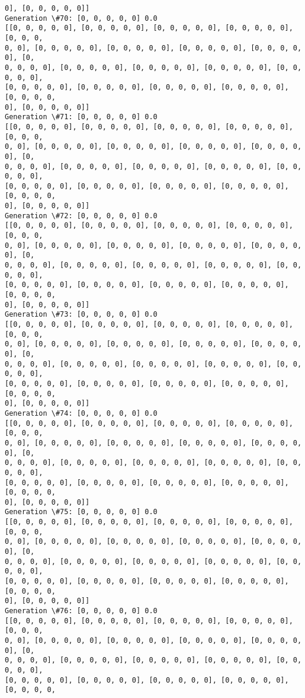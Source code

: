 \documentclass[11pt]{article}
\begin{document}
\begin{Verbatim}[commandchars=\\\{\}]
0], [0, 0, 0, 0, 0]]
Generation \#70: [0, 0, 0, 0, 0] 0.0
[[0, 0, 0, 0, 0], [0, 0, 0, 0, 0], [0, 0, 0, 0, 0], [0, 0, 0, 0, 0], [0, 0, 0,
0, 0], [0, 0, 0, 0, 0], [0, 0, 0, 0, 0], [0, 0, 0, 0, 0], [0, 0, 0, 0, 0], [0,
0, 0, 0, 0], [0, 0, 0, 0, 0], [0, 0, 0, 0, 0], [0, 0, 0, 0, 0], [0, 0, 0, 0, 0],
[0, 0, 0, 0, 0], [0, 0, 0, 0, 0], [0, 0, 0, 0, 0], [0, 0, 0, 0, 0], [0, 0, 0, 0,
0], [0, 0, 0, 0, 0]]
Generation \#71: [0, 0, 0, 0, 0] 0.0
[[0, 0, 0, 0, 0], [0, 0, 0, 0, 0], [0, 0, 0, 0, 0], [0, 0, 0, 0, 0], [0, 0, 0,
0, 0], [0, 0, 0, 0, 0], [0, 0, 0, 0, 0], [0, 0, 0, 0, 0], [0, 0, 0, 0, 0], [0,
0, 0, 0, 0], [0, 0, 0, 0, 0], [0, 0, 0, 0, 0], [0, 0, 0, 0, 0], [0, 0, 0, 0, 0],
[0, 0, 0, 0, 0], [0, 0, 0, 0, 0], [0, 0, 0, 0, 0], [0, 0, 0, 0, 0], [0, 0, 0, 0,
0], [0, 0, 0, 0, 0]]
Generation \#72: [0, 0, 0, 0, 0] 0.0
[[0, 0, 0, 0, 0], [0, 0, 0, 0, 0], [0, 0, 0, 0, 0], [0, 0, 0, 0, 0], [0, 0, 0,
0, 0], [0, 0, 0, 0, 0], [0, 0, 0, 0, 0], [0, 0, 0, 0, 0], [0, 0, 0, 0, 0], [0,
0, 0, 0, 0], [0, 0, 0, 0, 0], [0, 0, 0, 0, 0], [0, 0, 0, 0, 0], [0, 0, 0, 0, 0],
[0, 0, 0, 0, 0], [0, 0, 0, 0, 0], [0, 0, 0, 0, 0], [0, 0, 0, 0, 0], [0, 0, 0, 0,
0], [0, 0, 0, 0, 0]]
Generation \#73: [0, 0, 0, 0, 0] 0.0
[[0, 0, 0, 0, 0], [0, 0, 0, 0, 0], [0, 0, 0, 0, 0], [0, 0, 0, 0, 0], [0, 0, 0,
0, 0], [0, 0, 0, 0, 0], [0, 0, 0, 0, 0], [0, 0, 0, 0, 0], [0, 0, 0, 0, 0], [0,
0, 0, 0, 0], [0, 0, 0, 0, 0], [0, 0, 0, 0, 0], [0, 0, 0, 0, 0], [0, 0, 0, 0, 0],
[0, 0, 0, 0, 0], [0, 0, 0, 0, 0], [0, 0, 0, 0, 0], [0, 0, 0, 0, 0], [0, 0, 0, 0,
0], [0, 0, 0, 0, 0]]
Generation \#74: [0, 0, 0, 0, 0] 0.0
[[0, 0, 0, 0, 0], [0, 0, 0, 0, 0], [0, 0, 0, 0, 0], [0, 0, 0, 0, 0], [0, 0, 0,
0, 0], [0, 0, 0, 0, 0], [0, 0, 0, 0, 0], [0, 0, 0, 0, 0], [0, 0, 0, 0, 0], [0,
0, 0, 0, 0], [0, 0, 0, 0, 0], [0, 0, 0, 0, 0], [0, 0, 0, 0, 0], [0, 0, 0, 0, 0],
[0, 0, 0, 0, 0], [0, 0, 0, 0, 0], [0, 0, 0, 0, 0], [0, 0, 0, 0, 0], [0, 0, 0, 0,
0], [0, 0, 0, 0, 0]]
Generation \#75: [0, 0, 0, 0, 0] 0.0
[[0, 0, 0, 0, 0], [0, 0, 0, 0, 0], [0, 0, 0, 0, 0], [0, 0, 0, 0, 0], [0, 0, 0,
0, 0], [0, 0, 0, 0, 0], [0, 0, 0, 0, 0], [0, 0, 0, 0, 0], [0, 0, 0, 0, 0], [0,
0, 0, 0, 0], [0, 0, 0, 0, 0], [0, 0, 0, 0, 0], [0, 0, 0, 0, 0], [0, 0, 0, 0, 0],
[0, 0, 0, 0, 0], [0, 0, 0, 0, 0], [0, 0, 0, 0, 0], [0, 0, 0, 0, 0], [0, 0, 0, 0,
0], [0, 0, 0, 0, 0]]
Generation \#76: [0, 0, 0, 0, 0] 0.0
[[0, 0, 0, 0, 0], [0, 0, 0, 0, 0], [0, 0, 0, 0, 0], [0, 0, 0, 0, 0], [0, 0, 0,
0, 0], [0, 0, 0, 0, 0], [0, 0, 0, 0, 0], [0, 0, 0, 0, 0], [0, 0, 0, 0, 0], [0,
0, 0, 0, 0], [0, 0, 0, 0, 0], [0, 0, 0, 0, 0], [0, 0, 0, 0, 0], [0, 0, 0, 0, 0],
[0, 0, 0, 0, 0], [0, 0, 0, 0, 0], [0, 0, 0, 0, 0], [0, 0, 0, 0, 0], [0, 0, 0, 0,

\end{Verbatim}
\end{document}
